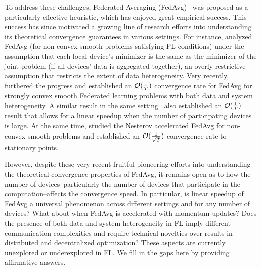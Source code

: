 To address these challenges, Federated Averaging (FedAvg)~\cite{mcmahan2016communication} was proposed as a particularly effective heuristic, which has enjoyed great empirical success. This success has since motivated a growing line of research efforts into understanding its theoretical convergence guarantees in various settings. For instance, \cite{haddadpour2019convergence} analyzed FedAvg (for non-convex smooth problems satisfying PL conditions) under the assumption that each local device's minimizer is the same as the minimizer of the joint problem (if all devices' data is aggregated together), an overly restrictive assumption that restricts the extent of data heterogeneity.
Very recently, \cite{li2019convergence} furthered the progress and established an ${\mathcal{O}}(\frac{1}{T})$ convergence rate for FedAvg for strongly convex smooth Federated learning problems with both data and system heterogeneity. A similar result in the same setting~\cite{karimireddy2019scaffold} also established an ${\mathcal{O}}(\frac{1}{T})$ result that allows for a linear speedup when the number of participating devices is large.
At the same time, \cite{huo2020faster} studied the Nesterov accelerated FedAvg for non-convex smooth problems and established 
an ${\mathcal{O}}(\frac{1}{\sqrt{T}})$ convergence rate to stationary points. 


However, despite these very recent fruitful pioneering efforts into understanding the theoretical convergence properties of FedAvg, it remains open as to how the number of devices--particularly the number of devices that participate in the computation--affects the convergence speed.
In particular, is linear speedup of FedAvg a universal phenomenon across different settings and for any number of devices? What about when FedAvg is accelerated with momentum updates? Does the presence of both data and system heterogeneity in FL imply different communication complexities and require technical novelties over results in distributed and decentralized optimization? These aspects are currently unexplored or underexplored in FL. We fill in the gaps here by providing affirmative answers.

